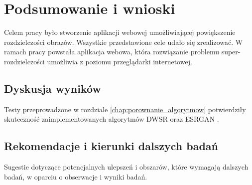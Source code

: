 \chapter{Podsumowanie i wnioski} \label{chap:podsumowanie}

Celem pracy było stworzenie aplikacji webowej umożliwiającej powiększenie rozdzielczości obrazów. Wszystkie przedstawione cele udało się zrealizować. W ramach pracy powstała aplikacja webowa, która rozwiązanie problemu super-rozdzielczości umożliwia z poziomu przeglądarki internetowej. 


\section{Dyskusja wyników}

Testy przeprowadzone w rozdziale \ref{chap:porownanie_algorytmow} potwierdziły skuteczność zaimplementowanych algorytmów DWSR \cite{guo2017deep} oraz ESRGAN \cite{wang2018esrgan}. 










\section{Rekomendacje i kierunki dalszych badań}


Sugestie dotyczące potencjalnych ulepszeń i obszarów, które wymagają dalszych badań, w oparciu o obserwacje i wyniki badań.
